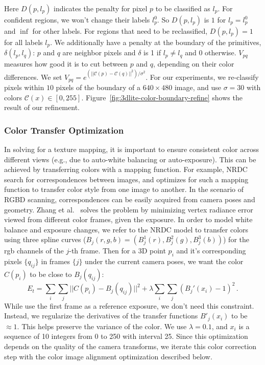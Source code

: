 Here $D(p,l_p)$ indicates the penalty for pixel $p$ to be classified as $l_p$. 
For confident regions, we won't change their labels $l_p^0$. 
So $D(p,l_p)$ is $1$ for $l_p=l_p^0$ and $\inf$ for other labels. 
For regions that need to be reclassified, $D(p,l_p)=1$ for all labels $l_p$. 
We additionally have a penalty at the boundary of the primitives, $\delta(l_p,l_q)$: $p$ and $q$ are neighbor pixels and $\delta$ is 1 if $l_p\neq l_q$ and 0 otherwise. 
$V_{pq}$ measures how good it is to cut between $p$ and $q$, depending on their color differences. We set
$V_{pq}=e^{\left(||\mathcal{C}(p)-\mathcal{C}(q)||^2\right)/\sigma^2}$.  %
For our experiments, we re-classify pixels within $10$ pixels of the boundary of a $640\times 480$ image, and use $\sigma=30$ with colors $\mathcal{C}(x)\in[0,255]$.
Figure~\ref{fig:3dlite-color-boundary-refine} shows the result of our refinement.

\subsubsection{Color Transfer Optimization}
\label{subsec:3dlite-color-transfer}
In solving for a texture mapping, it is important to ensure consistent color across different views (e.g., due to auto-white balancing or auto-exposure).
This can be achieved by transferring colors with a mapping function.
For example, NRDC~\cite{hacohen2011non} search for correspondences between images, and optimizes for such a mapping function to transfer color style from one image to another.
In the scenario of RGBD scanning, correspondences can be easily acquired from camera poses and geometry. 
Zhang et al.~\cite{zhang2016emptying} solves the problem by minimizing vertex radiance error viewed from different color frames, given the exposure. 
In order to model white balance and exposure changes, we refer to the NRDC model to transfer colors using three spline curves ($B_j(r,g,b)=(B^1_j(r),B^2_j(g),B^3_j(b))$) for the rgb channels of the $j$-th frame. 
Then for a 3D point $p_i$ and it's corresponding pixels $\{q_{ij}\}$ in frames $\{j\}$ under the current camera poses, we want the color $C(p_i)$ to be close to $B_j(q_{ij})$:
\begin{equation}
E_t = \sum_{i} \sum_{j} ||C(p_i) - B_j(q_{ij})||^2 + \lambda \sum_{i} \sum_{j} (B_j'(x_i)-1)^2\,.
\end{equation}
While \cite{zhang2016emptying} use the first frame as a reference exposure, we don't need this constraint. 
Instead, we regularize the derivatives of the transfer functions $B'_j(x_i)$ to be $\approx 1$. 
This helps preserve the variance of the color. 
We use $\lambda = 0.1$, and $x_i$ is a sequence of 10 integers from 0 to 250 with interval 25.
Since this optimization depends on the quality of the camera transforms, we iterate this color correction step with the color image alignment optimization described below.

